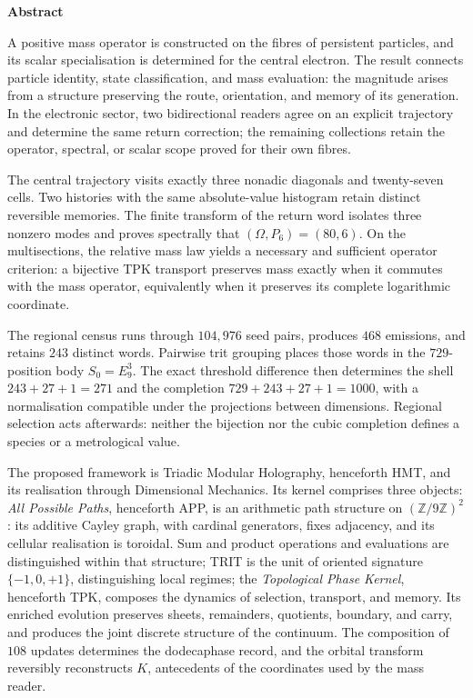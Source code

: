 \begin{center}\bfseries Abstract\end{center}
\begingroup
\fontsize{9.5}{10.7}\selectfont
\setlength{\parskip}{1.5pt plus .5pt minus .5pt}
\noindent
A positive mass operator is constructed on the fibres of persistent
particles, and its scalar specialisation is determined for the central
electron. The result connects particle identity, state classification,
and mass evaluation: the magnitude arises from a structure preserving
the route, orientation, and memory of its generation. In the electronic
sector, two bidirectional readers agree on an explicit trajectory and
determine the same return correction; the remaining collections retain the
operator, spectral, or scalar scope proved for their own fibres.

The central trajectory visits exactly three nonadic diagonals and twenty-seven
cells. Two histories with the same absolute-value histogram retain distinct
reversible memories. The finite transform of the return word isolates three
nonzero modes and proves spectrally that $(\Omega,P_6)=(80,6)$. On the multisections, the
relative mass law yields a necessary and sufficient operator criterion: a
bijective TPK transport preserves mass exactly when it commutes with the mass
operator, equivalently when it preserves its complete logarithmic coordinate.

The regional census runs through \(104{,}976\) seed pairs, produces \(468\)
emissions, and retains \(243\) distinct words. Pairwise trit grouping places
those words in the \(729\)-position body \(S_0=E_9^3\). The exact threshold
difference then determines the shell \(243+27+1=271\) and the completion
\(729+243+27+1=1000\), with a normalisation compatible under the projections
between dimensions. Regional selection acts afterwards: neither the bijection
nor the cubic completion defines a species or a metrological value.

The proposed framework is Triadic Modular Holography, henceforth HMT, and
its realisation through Dimensional Mechanics. Its kernel comprises three
objects: \emph{All Possible Paths}, henceforth APP, is an arithmetic path
structure on \((\mathbb Z/9\mathbb Z)^2\): its additive Cayley graph,
with cardinal generators, fixes adjacency, and its cellular realisation
is toroidal. Sum and product operations and evaluations are distinguished
within that structure; TRIT is the unit
of oriented signature \(\{-1,0,+1\}\), distinguishing local regimes;
the \emph{Topological Phase Kernel}, henceforth TPK, composes the dynamics
of selection, transport, and memory. Its enriched evolution preserves
sheets, remainders, quotients, boundary, and carry, and produces the joint
discrete structure of the continuum. The composition of \(108\) updates
determines the dodecaphase record, and the orbital transform reversibly
reconstructs \(K\),
antecedents of the coordinates used by the mass reader.

